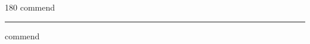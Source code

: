 
\begin{frame}
\begin{center}
\begin{turn}{180}
{\fontsize{2.5cm}{1em}\selectfont commend}
\end{turn}
\vspace{1em}\par  
\hrule
\vspace{1em}\par  
{\fontsize{2.5cm}{1em}\selectfont commend}
\end{center}
\end{frame}
